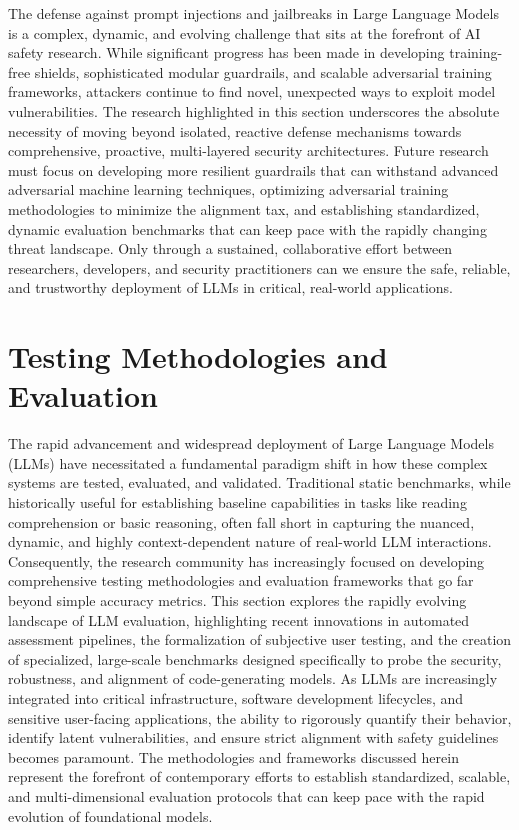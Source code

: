 \documentclass[11pt,a4paper]{article}
\begin{document}
The defense against prompt injections and jailbreaks in Large Language Models is a complex, dynamic, and evolving challenge that sits at the forefront of AI safety research. While significant progress has been made in developing training-free shields, sophisticated modular guardrails, and scalable adversarial training frameworks, attackers continue to find novel, unexpected ways to exploit model vulnerabilities. The research highlighted in this section underscores the absolute necessity of moving beyond isolated, reactive defense mechanisms towards comprehensive, proactive, multi-layered security architectures. Future research must focus on developing more resilient guardrails that can withstand advanced adversarial machine learning techniques, optimizing adversarial training methodologies to minimize the alignment tax, and establishing standardized, dynamic evaluation benchmarks that can keep pace with the rapidly changing threat landscape. Only through a sustained, collaborative effort between researchers, developers, and security practitioners can we ensure the safe, reliable, and trustworthy deployment of LLMs in critical, real-world applications.

\section{Testing Methodologies and Evaluation}

The rapid advancement and widespread deployment of Large Language Models (LLMs) have necessitated a fundamental paradigm shift in how these complex systems are tested, evaluated, and validated. Traditional static benchmarks, while historically useful for establishing baseline capabilities in tasks like reading comprehension or basic reasoning, often fall short in capturing the nuanced, dynamic, and highly context-dependent nature of real-world LLM interactions. Consequently, the research community has increasingly focused on developing comprehensive testing methodologies and evaluation frameworks that go far beyond simple accuracy metrics. This section explores the rapidly evolving landscape of LLM evaluation, highlighting recent innovations in automated assessment pipelines, the formalization of subjective user testing, and the creation of specialized, large-scale benchmarks designed specifically to probe the security, robustness, and alignment of code-generating models. As LLMs are increasingly integrated into critical infrastructure, software development lifecycles, and sensitive user-facing applications, the ability to rigorously quantify their behavior, identify latent vulnerabilities, and ensure strict alignment with safety guidelines becomes paramount. The methodologies and frameworks discussed herein represent the forefront of contemporary efforts to establish standardized, scalable, and multi-dimensional evaluation protocols that can keep pace with the rapid evolution of foundational models.
\end{document}
